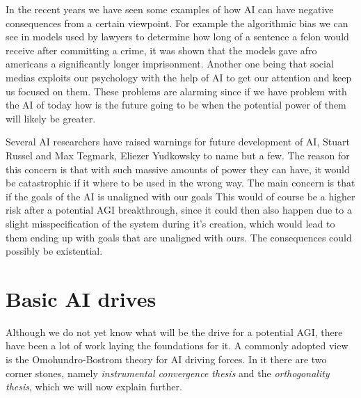 \documentclass{report}
\newcommand{\autocite}{}
\theoremstyle{definition}
\begin{document}
In the recent years we have seen some examples of how AI can have negative consequences from a certain viewpoint. For example the algorithmic bias we can see in models used by lawyers to determine how long of a sentence a felon would receive after committing a crime, it was shown that the models gave afro americans a significantly longer imprisonment. Another one being that social medias exploits our psychology with the help of AI to get our attention and keep us focused on them. These problems are alarming since if we have problem with the AI of today how is the future going to be when the potential power of them will likely be greater. 

Several AI researchers have raised warnings for future development of AI, Stuart Russel and Max Tegmark, Eliezer Yudkowsky to name but a few. The reason for this concern is that with such massive amounts of power they can have, it would be catastrophic if it where to be used in the wrong way. The main concern is that if the goals of the AI is unaligned with our goals This would of course be a higher risk after a potential AGI breakthrough, since it could then also happen due to a slight misspecification of the system during it's creation, which would lead to them ending up with goals that are unaligned with ours. The consequences could possibly be existential. 



\section{Basic AI drives}
Although we do not yet know what will be the drive for a potential AGI, there have been a lot of work laying the foundations for it. A commonly adopted view is the Omohundro-Bostrom theory for AI driving forces. In it there are two corner stones, namely \textit{instrumental convergence thesis} and the \textit{orthogonality thesis}, which we will now explain further.
\end{document}
